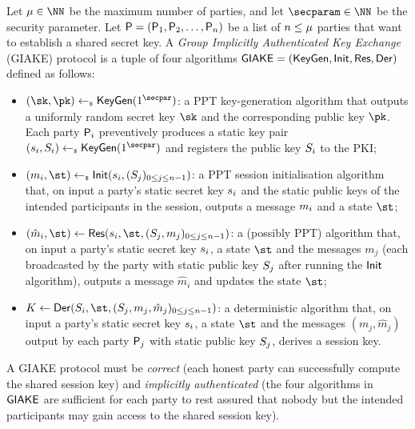 \begin{plaindef}[GIAKE]\label{def:GKE}
	Let $\projectKey \in \NN$ be the maximum number of parties, and let $\secparam\in \NN$ be the security parameter. 
	Let $\PartySet = (\User[1],\User[2],\dots,\allowbreak \User[n])$ be a list of $n \leq \projectKey$ parties that want to establish a shared secret key.
	A \textit{Group Implicitly Authenticated Key Exchange} (GIAKE) protocol is a tuple of four algorithms $\GIAKE = (\KeyGen, \GAKEIni, \GAKERes, \GAKEDer)$ defined as follows:
	\begin{itemize}
		\item $(\sk,\pk) \getsr \KeyGen(1^\secpar)$: a PPT key-generation algorithm that outputs a uniformly random secret key $\sk$ and the corresponding public key $\pk$.
		Each party $\User[i]$ preventively produces a static key pair $(\ssk_i,\spk_i) \getsr \KeyGen(1^\secpar)$ and registers the public key $\spk_i$ to the PKI;
		\item $(m_i,\st) \getsr \GAKEIni (\ssk_i,(\spk_j)_{0\leq j \leq n-1})$: a PPT session initialisation algorithm that, on input a party's static secret key $\ssk_i$ and the static public keys of the intended participants in the session, outputs a message $\messageIni$ and a state $\st$;
		\item $(\hat{m}_i,\st) \gets \GAKERes(\ssk_i,\st,(\spk_j,m_j)_{0\leq j \leq n-1})$: a (possibly PPT) algorithm that, on input a party's static secret key $\ssk_i$, a state $\st$ and the messages $m_j$ (each broadcasted by the party with static public key $\spk_j$ after running the $\GAKEIni$ algorithm), outputs a message $\hat{m}_i$ and updates the state $\st$;
		\item $K \gets \GAKEDer (\spk_i,\st,(\spk_j,m_j,\hat{m}_j)_{0\leq j \leq n-1})$: a deterministic algorithm that,  on input a party's static secret key $\ssk_i$, a state $\st$ and the messages $(m_j,\hat{m}_j)$ output by each party $\User[j]$ with static public key $\spk_j$, derives a session key.
	\end{itemize}
	A GIAKE protocol must be \textit{correct} (each honest party can successfully compute the shared session key) and \textit{implicitly authenticated} (the four algorithms in $\GIAKE$ are sufficient for each party to rest assured that nobody but the intended participants may gain access to the shared session key).
\end{plaindef}

